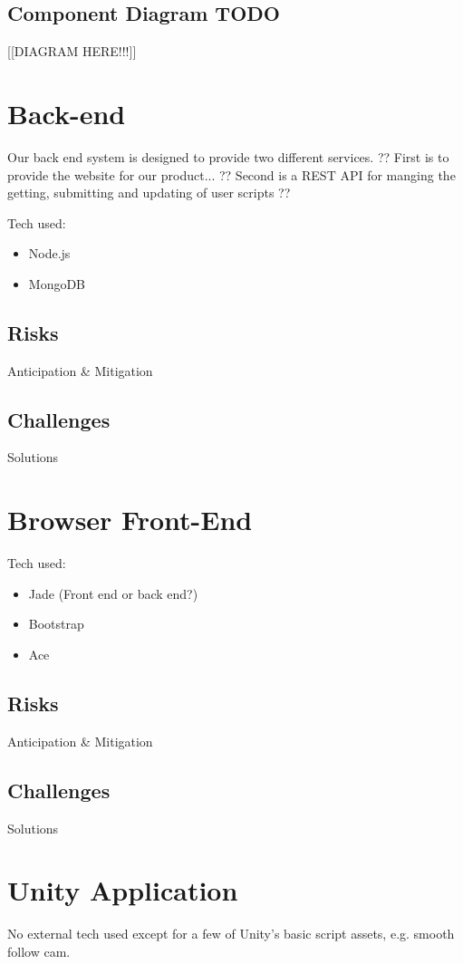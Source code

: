 \subsection{Component Diagram TODO}

[[DIAGRAM HERE!!!]]

\section{Back-end}

Our back end system is designed to provide two different services. ??
First is to provide the website for our product... ??
Second is a REST API for manging the getting, submitting and updating of user scripts ?? 

Tech used:
\begin{itemize}
\item Node.js
\item MongoDB
\end{itemize}

\subsection{Risks}
Anticipation \& Mitigation

\subsection{Challenges}
Solutions

\section{Browser Front-End}
Tech used:
\begin{itemize}
\item Jade (Front end or back end?)
\item Bootstrap
\item Ace
\end{itemize}
\subsection{Risks}
Anticipation \& Mitigation

\subsection{Challenges}
Solutions


\section{Unity Application}
No external tech used except for a few of Unity's basic script assets, e.g. smooth follow cam.

